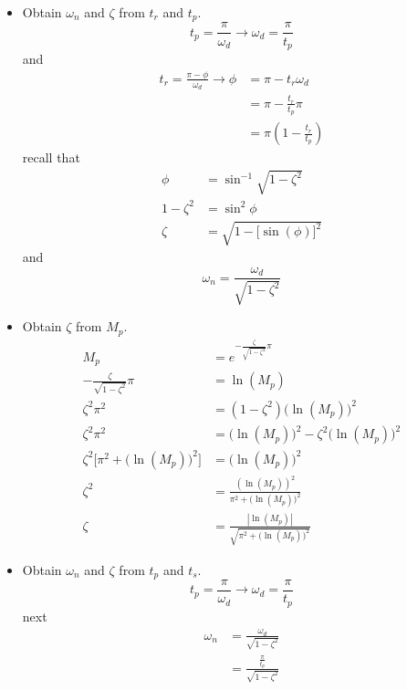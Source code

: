 \documentclass[12pt,letter]{article}
\begin{document}
\begin{itemize}
\item Obtain $\omega_n$ and $\zeta$ from $t_r$ and $t_p$.  
\begin{equation}
t_p = \frac{\pi}{\omega_d} \rightarrow \omega_d = \frac{\pi}{t_p}
\end{equation}
and
\begin{align}
t_r  = \frac{\pi - \phi}{\omega_d} \rightarrow \phi &= \pi - t_r \omega_d  \\
 &= \pi -\frac{t_r}{t_p} \pi \nonumber \\
 &= \pi(1-\frac{t_r}{t_p}) \nonumber 
\end{align}
recall that 
\begin{align}
\phi &= \sin^{-1} \sqrt{1-\zeta^2} \\
1-\zeta^2 &= \sin^2 \phi \nonumber \\
\zeta &= \sqrt{1-\big[\sin (\phi)\big]^2}
\end{align}
and
\begin{equation}
\omega_n = \frac{\omega_d}{\sqrt{1-\zeta^2}}
\end{equation}
\item  Obtain $\zeta$ from $M_p$.  
\begin{align}
M_p  &= e^{- \frac{\zeta}{\sqrt{1-\zeta^2}} \pi } \\
- \frac{\zeta}{\sqrt{1-\zeta^2}} \pi  &= \ln(M_p) \nonumber \\
\zeta^2 \pi^2 &= (1-\zeta^2)\big(\ln(M_p)\big)^2  \nonumber \\
\zeta^2 \pi^2 &= \big(\ln(M_p)\big)^2  - \zeta^2 \big(\ln(M_p)\big)^2  \nonumber \\
\zeta^2 \bigg[\pi^2 + \big(\ln(M_p)\big)^2 \bigg] &= \big(\ln(M_p)\big)^2   \nonumber \\
\zeta^2 &= \frac{(\ln(M_p))^2}{\pi^2 + \big(\ln(M_p)\big)^2 }    \nonumber \\
\zeta &= \frac{|\ln(M_p)|}{\sqrt{\pi^2 + \big(\ln(M_p)\big)^2 }}    \nonumber
\end{align}
\item Obtain $\omega_n$ and $\zeta$ from $t_p$ and $t_s$.  
\begin{equation}
t_p = \frac{\pi}{\omega_d} \rightarrow \omega_d = \frac{\pi}{t_p}
\end{equation}
next
\begin{align}
\omega_n &= \frac{\omega_d}{\sqrt{1-\zeta^2}} \\
&= \frac{\frac{\pi}{t_p}}{ \sqrt{1-\zeta^2}}  \nonumber \\

\end{align}
\end{itemize}
\end{document}
